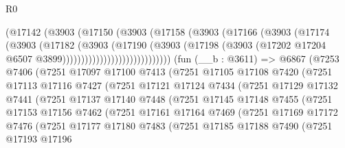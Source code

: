 \begin{lexlean}{R0}
\begin{coremodule}
                            (@17142
                              (@3903
                                (@17150
                                  (@3903
                                    (@17158
                                      (@3903
                                        (@17166
                                          (@3903
                                            (@17174
                                              (@3903
                                                (@17182
                                                  (@3903
                                                    (@17190
                                                      (@3903
                                                        (@17198
                                                          (@3903
                                                            (@17202
                                                              @17204
                                                              @6507
                                                              @3899)))))))))))))))))))))))))))))
    (fun (__b : @3611) =>
    @6867
      (@7253
        @7406
        (@7251
          @17097
          @17100
          @7413
          (@7251
            @17105
            @17108
            @7420
            (@7251
              @17113
              @17116
              @7427
              (@7251
                @17121
                @17124
                @7434
                (@7251
                  @17129
                  @17132
                  @7441
                  (@7251
                    @17137
                    @17140
                    @7448
                    (@7251
                      @17145
                      @17148
                      @7455
                      (@7251
                        @17153
                        @17156
                        @7462
                        (@7251
                          @17161
                          @17164
                          @7469
                          (@7251
                            @17169
                            @17172
                            @7476
                            (@7251
                              @17177
                              @17180
                              @7483
                              (@7251
                                @17185
                                @17188
                                @7490
                                (@7251
                                  @17193
                                  @17196

\end{coremodule}
\end{lexlean}
